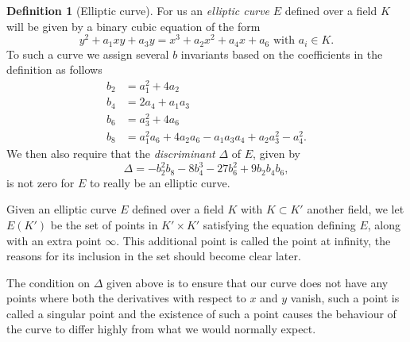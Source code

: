 \documentclass[12pt,a4paper,abstracton,bibtotoc]{scrreprt}
\theoremstyle{definition}
\newtheorem{defn}{Definition}
\begin{document}
\begin{defn}[Elliptic curve]
For us an \emph{elliptic curve} $E$ defined over a field $K$ will be given by a binary cubic equation of the form
\[
y^2 + a_1xy + a_3y = x^3 + a_2x^2 + a_4x + a_6\text{ with }a_i\in K.
\]
To such a curve we assign several $b$ invariants based on the coefficients in the definition as follows
\begin{align*}
b_2 &= a_1^2 + 4a_2\\
b_4 &= 2a_4 + a_1a_3\\
b_6 &= a_3^2 + 4a_6\\
b_8 &= a_1^2a_6 + 4a_2a_6 - a_1a_3a_4 + a_2a_3^2 -a_4^2.
\end{align*}
We then also require that the \emph{discriminant} $\Delta$ of $E$, given by
\[
\Delta = -b_2^2b_8 -8b_4^3 -27b_6^2 +9b_2b_4b_6,
\]
is not zero for $E$ to really be an elliptic curve.

Given an elliptic curve $E$ defined over a field $K$ with $K \subset K'$ another field, we let $E(K')$ be the set of points in $K'\times K'$ satisfying the equation defining $E$, along with an extra point $\infty$.
This additional point is called the point at infinity, the reasons for its inclusion in the set should become clear later.
\end{defn}

The condition on $\Delta$ given above is to ensure that our curve does not have any points where both the derivatives with respect to $x$ and $y$ vanish, such a point is called a singular point and the existence of such a point causes the behaviour of the curve to differ highly from what we would normally expect.
\end{document}
